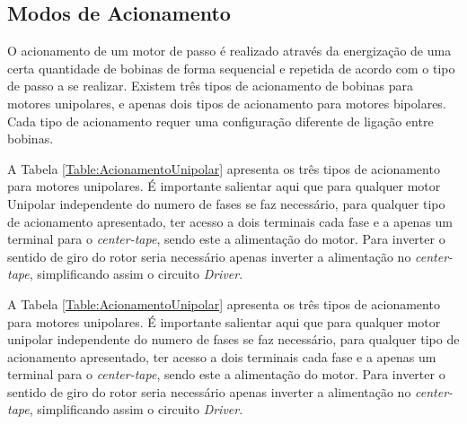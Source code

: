 \subsection{Modos de Acionamento} 

O acionamento de um motor de passo é realizado através da energização de uma certa quantidade de bobinas de forma sequencial e repetida de acordo com o tipo de passo a se realizar. Existem três tipos de acionamento de bobinas para motores unipolares, e apenas dois tipos de acionamento para motores bipolares. Cada tipo de acionamento requer uma configuração diferente de ligação entre bobinas.

A Tabela \ref{Table:AcionamentoUnipolar} apresenta os três tipos de acionamento para motores unipolares. É importante salientar aqui que para qualquer motor Unipolar independente do numero de fases se faz necessário, para qualquer tipo de acionamento apresentado, ter acesso a dois terminais cada fase e a apenas um terminal para o \emph{center-tape}, sendo este a alimentação do motor. Para inverter o sentido de giro do rotor seria necessário apenas inverter a alimentação no \emph{center-tape}, simplificando assim o circuito \emph{Driver}. 

A Tabela \ref{Table:AcionamentoUnipolar} apresenta os três tipos de acionamento para motores unipolares. É importante salientar aqui que  para qualquer motor unipolar independente do numero de fases se faz necessário, para qualquer tipo de acionamento apresentado, ter acesso a dois terminais cada fase e a apenas um terminal para o \emph{center-tape}, sendo este a alimentação do motor. Para inverter o sentido de giro do rotor seria necessário apenas inverter a alimentação no \emph{center-tape}, simplificando assim o circuito \emph{Driver}. 

